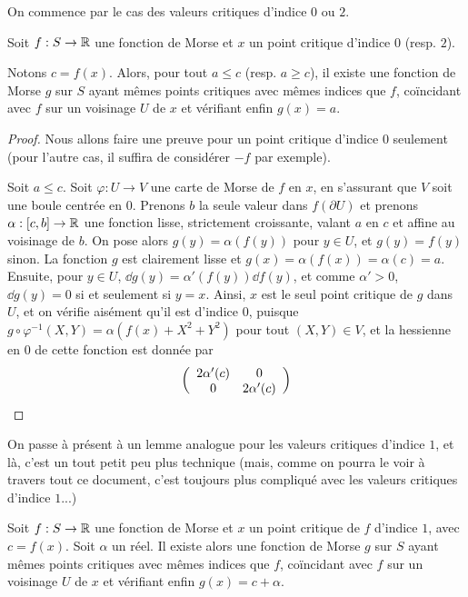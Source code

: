 On commence par le cas des valeurs critiques d'indice $0$ ou $2$. 

\begin{lem}
    Soit $f:S\to\operatorname{\mathbb R}$ une fonction de Morse et $x$ un point critique d'indice $0$ (resp. $2$).

    Notons $c=f(x)$. Alors, pour tout $a\leq c$ (resp. $a\geq c$), il existe une fonction de 
    Morse $g$ sur $S$ ayant mêmes points critiques avec mêmes indices que $f$,
    coïncidant avec $f$ sur un voisinage $U$ de $x$ et vérifiant enfin $g(x)=a$. 
\end{lem}

\begin{proof}
    Nous allons faire une preuve pour un point critique d'indice $0$ seulement (pour l'autre cas, 
    il suffira de considérer $-f$ par exemple). 

    Soit $a\leq c$. Soit $\varphi:U\to V$ une carte de Morse de $f$ en $x$, en s'assurant que 
    $V$ soit une boule centrée en $0$. 
    Prenons $b$ la seule valeur dans $f(\partial U)$ et prenons $\alpha:[c,b]\to\operatorname{\mathbb R}$ une fonction 
    lisse, strictement croissante, valant $a$ en $c$ et affine au voisinage de $b$. 
    On pose alors $g(y)=\alpha(f(y))$ pour $y\in U$, et $g(y)=f(y)$ sinon.
    La fonction $g$ est clairement lisse et $g(x)=\alpha(f(x))=\alpha(c)=a$.
    Ensuite, pour $y\in U$, $\dd g(y)=\alpha'(f(y))\dd f(y)$, et comme $\alpha'>0$, $\dd g(y)=0$ 
    si et seulement si $y=x$. 
    Ainsi, $x$ est le seul point critique de $g$ dans $U$, et on vérifie aisément qu'il est 
    d'indice $0$, puisque $g\circ\varphi^{-1}(X,Y)=\alpha(f(x)+X^2+Y^2)$ pour tout $(X,Y)\in V$, 
    et  la hessienne en $0$ de cette fonction est donnée par 
    \[
        \left(\begin{array}{c c} 2\alpha'(c) & 0\\ 0 & 2\alpha'(c)\end{array}\right)
    \]
\end{proof}

On passe à présent à un lemme analogue pour les valeurs critiques d'indice $1$, et là, c'est un 
tout petit peu plus technique (mais, comme on pourra le voir à travers tout ce document, c'est 
toujours plus compliqué avec les valeurs critiques d'indice $1$...)

\begin{lem}
    Soit $f:S\to\operatorname{\mathbb R}$ une fonction de Morse et $x$ un point critique de $f$ d'indice $1$, avec 
    $c=f(x)$.
    Soit $\alpha$ un réel. 
    Il existe alors une fonction de Morse $g$ sur $S$ ayant mêmes points critiques avec mêmes 
    indices que $f$, coïncidant avec $f$ sur un voisinage $U$ de $x$ et vérifiant enfin 
    $g(x)=c+\alpha$. 
\end{lem}


